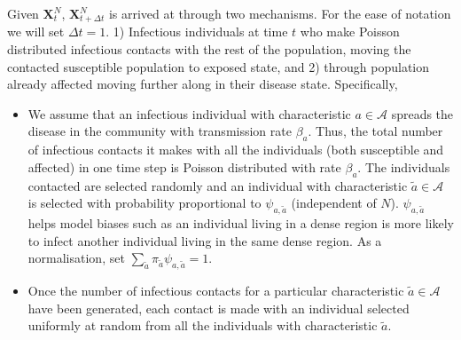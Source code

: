 \documentclass{article}
\theoremstyle{definition}
\begin{document}
 Given ${\bm{X}_t^N}$, ${\bm{X}_{t+\Delta t}^N}$ is  arrived at  through two mechanisms.  For the ease of notation we will set $\Delta t =1$.   
1) Infectious individuals at time $t$ who make Poisson distributed infectious contacts with 
 the rest of the population, moving the contacted susceptible population to exposed state, and 2) through population already affected moving further
 along in their disease state. Specifically, 
 \begin{itemize}
 \item 
        We assume that an infectious individual with characteristic $a \in \mathcal A$ spreads the disease in the community with transmission rate $\beta_a$. 
        Thus, the total number of infectious contacts it makes  with all the individuals (both susceptible and affected)  in one time step is
         Poisson distributed with rate ${\beta_{a}}$. The individuals contacted are selected randomly and an individual with characteristic $\tilde{a}\in \mathcal A$ is selected with probability
         proportional to ${\psi_{a,\tilde{a}}}$ (independent of $N$). $\psi_{a,\tilde{a}}$  helps model biases such as an individual living in a dense region is more likely to infect another
         individual living in the same dense region.  As a normalisation, set $\sum_{\tilde{a}}\pi_{\tilde{a}} \psi_{a,\tilde{a}}=1$. 
         
         \item Once the number of infectious contacts for a particular characteristic $\tilde{a} \in \mathcal A$   have been generated, each contact is made with an individual selected uniformly at random from all the individuals with characteristic $\tilde{a}$.
         

\end{itemize}
\end{document}
